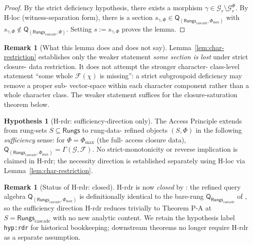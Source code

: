 \documentclass[11pt, a4paper]{amsart}
\theoremstyle{definition}
\newtheorem{remark}[theorem]{Remark}
\newtheorem{hypothesis}[theorem]{Hypothesis}
\newcommand{\Rungs}{\mathsf{Rungs}}
\newcommand{\Fcal}{\mathcal{F}}
\newcommand{\Gcal}{\mathcal{G}}
\newcommand{\Qalg}{\mathsf{Q}}
\begin{document}
\begin{proof}
By the strict deficiency hypothesis, there exists a morphism
$\gamma \in \Gcal_r \setminus \Gcal_r^\Phi$. By H-loc
(witness-separation form), there is a section
$s_{\gamma,\Phi} \in
\Qalg_{(\Rungs_{\mathrm{cascade}}, \Phi_{\max})}$ with
$s_{\gamma, \Phi} \notin
\Qalg_{(\Rungs_{\mathrm{cascade}}, \Phi)}$. Setting $s :=
s_{\gamma,\Phi}$ proves the lemma.
\end{proof}

\begin{remark}[What this lemma does and does not say]
\label{rmk:char-restriction-scope}
Lemma~\ref{lem:char-restriction} establishes only the weaker
statement \emph{some section is lost} under strict closure-
data restriction. It does not attempt the stronger character-
class-level statement ``some whole $\Fcal(\chi)$ is missing'':
a strict subgroupoid deficiency may remove a proper sub-
vector-space within each character component rather than a
whole character class. The weaker statement suffices for the
closure-saturation theorem below.
\end{remark}

\begin{hypothesis}[H-rdr: sufficiency-direction only]
\label{hyp:rdr}
The Access Principle \cite[Theorem P-A]{CascadeAccessPrinciple}
extends from rung-sets $S \subseteq \Rungs$ to rung-data-
refined objects $(S, \Phi)$ in the following
\emph{sufficiency} sense: for $\Phi = \Phi_{\max}$ (the full-
access closure data),
$\Qalg_{(\Rungs_{\mathrm{cascade}}, \Phi_{\max})} =
\Gamma(\Gcal, \Fcal)$. No strict-monotonicity or reverse
implication is claimed in H-rdr; the necessity direction is
established separately using H-loc via
Lemma~\ref{lem:char-restriction}.
\end{hypothesis}

\begin{remark}[Status of H-rdr: closed]
\label{rmk:H-rdr-status}
H-rdr is now \emph{closed} by \cite{CascadeHrdrClosure}: the
refined query algebra
$\Qalg_{(\Rungs_{\mathrm{cascade}}, \Phi_{\max})}$ is
definitionally identical to the bare-rung
$\Qalg_{\Rungs_{\mathrm{cascade}}}$ of
\cite{CascadeAccessPrinciple}, so the sufficiency direction
H-rdr reduces trivially to Theorem P-A at $S =
\Rungs_{\mathrm{cascade}}$ with no new analytic content. We
retain the hypothesis label \texttt{hyp:rdr} for historical
bookkeeping; downstream theorems no longer require H-rdr as
a separate assumption.
\end{remark}
\end{document}
